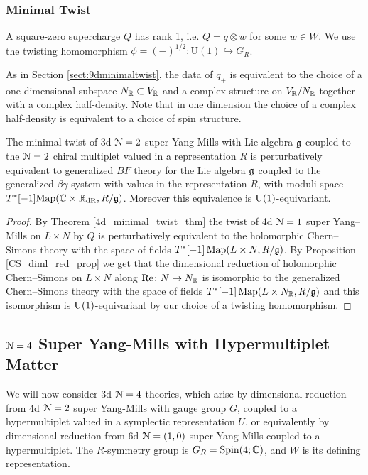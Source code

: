 \documentclass[10pt, oneside]{article}
\renewcommand{\Re}{\mathrm{Re}}
\renewcommand{\U}{\mathrm{U}}
\begin{document}
\subsubsection{Minimal Twist}
\label{sect:3dminimaltwist}
A square-zero supercharge $Q$ has rank 1, i.e. $Q = q \otimes w$ for some $w \in W$.  
We use the twisting homomorphism $\phi = (-)^{1/2} \colon \U(1)\hookrightarrow G_R$.

As in Section \ref{sect:9dminimaltwist}, the data of $q_+$ is equivalent to the choice of a one-dimensional subspace $N_\mathbb R\subset V_\mathbb R$ and a complex structure on $V_\mathbb R/N_\mathbb R$ together with a complex half-density.  Note that in one dimension the choice of a complex half-density is equivalent to a choice of spin structure.

\begin{theorem} \label{3d_minimal_twist_thm}
The minimal twist of 3d $\mathcal N=2$ super Yang-Mills with Lie algebra $\mathfrak g$ coupled to the $\mathcal N=2$ chiral multiplet valued in a representation $R$ is perturbatively equivalent to generalized $BF$ theory for the Lie algebra $\mathfrak g$ coupled to the generalized $\beta\gamma$ system with values in the representation $R$, with moduli space $T^*[-1]\mathrm{Map}(\mathbb C \times \mathbb R_{\mathrm{dR}}, R/\mathfrak{g})$. Moreover this equivalence is $\mathrm{U}(1)$-equivariant.
\end{theorem}

\begin{proof}
By Theorem \ref{4d_minimal_twist_thm} the twist of 4d $\mathcal N=1$ super Yang--Mills on $L\times N$ by $Q$ is perturbatively equivalent to the holomorphic Chern--Simons theory with the space of fields $T^*[-1]\operatorname{Map}(L\times N, R / \mathfrak g)$. By Proposition \ref{CS_diml_red_prop} we get that the dimensional reduction of holomorphic Chern--Simons on $L\times N$ along $\Re\colon N\rightarrow N_\RR$ is isomorphic to the generalized Chern--Simons theory with the space of fields $T^*[-1]\operatorname{Map}(L\times N_\mathbb R, R/\mathfrak g)$ and this isomorphism is $\mathrm{U}(1)$-equivariant by our choice of a twisting homomorphism.
\end{proof}

\subsection{\texorpdfstring{$\mathcal N = 4$}{N=4} Super Yang-Mills with Hypermultiplet Matter} \label{3d_4_section}
We will now consider 3d $\mathcal{N}=4$ theories, which arise by dimensional reduction from 4d $\mathcal{N}=2$ super Yang-Mills with gauge group $G$, coupled to a hypermultiplet valued in a symplectic representation $U$, or equivalently by dimensional reduction from 6d $\mathcal{N}=(1,0)$ super Yang-Mills coupled to a hypermultiplet.  The $R$-symmetry group is $G_R = \mathrm{Spin}(4;\mathbb C)$, and $W$ is its defining representation.
\end{document}

